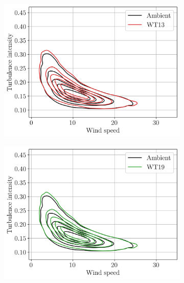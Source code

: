 \begin{figure}
    \centering
    \begin{subfigure}[b]{0.48\textwidth}
        \includegraphics[width=\textwidth]{part2/figures/WAKE/joint_perturbation_SB_WT13.png}
    \end{subfigure}
    \begin{subfigure}[b]{0.48\textwidth}
        \includegraphics[width=\textwidth]{part2/figures/WAKE/joint_perturbation_SB_WT19.png}
    \end{subfigure}
    \\
    \begin{subfigure}[b]{0.48\textwidth}

\end{subfigure}
\end{figure}
